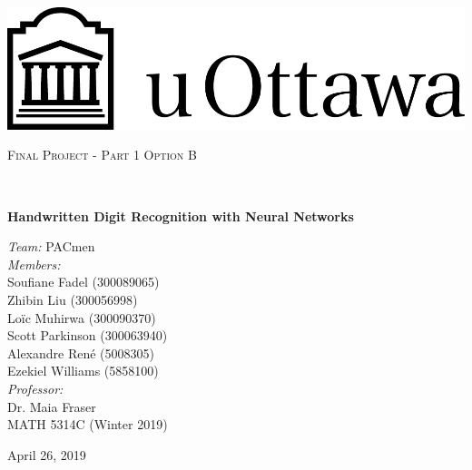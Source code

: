 \documentclass{article}
\begin{document}
\begin{center}

  \vspace{1cm}
  \includegraphics[scale = 0.8]{uottawa_hor_black.png}
  \vspace*{3.5cm}



  \begin{minipage}{0.9\textwidth} 
    \begin{center}
      \textsc{\LARGE Final Project - Part 1 Option B}
    \end{center}
  \end{minipage}\\[0.5cm]
  
  \vspace*{1cm}

  { \huge \bfseries  Handwritten Digit Recognition with Neural Networks}

  \vspace*{2cm}
  { \large 
      \emph{Team:} PACmen \\
      \vspace*{1cm}
    \emph{Members:}\\	
      Soufiane Fadel (300089065) \\
      Zhibin Liu (300056998) \\
      Loïc Muhirwa (300090370)\\
      Scott Parkinson (300063940)\\
      Alexandre Ren\'e (5008305) \\
      Ezekiel Williams (5858100)\\
    \vspace*{2.5cm}
    \emph{Professor:} \\													  
    Dr. Maia Fraser \\
  }
    \vspace{2cm}
    MATH 5314C (Winter 2019)	\\
    \vspace{1cm}
  \begin{center}
    {April 26, 2019}
  \end{center}
  
\end{center}
																		
\end{document}
